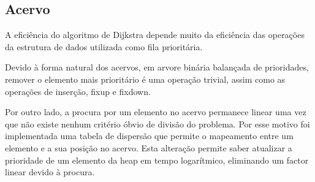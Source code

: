 \documentclass[portuguese, a4paper]{article}
\begin{document}
	\subsection{Acervo}
	\par
	A eficiência do algoritmo de Dijkstra depende muito da eficiência das
	operações da estrutura de dados utilizada como fila prioritária.
	\par
	Devido à forma natural dos acervos, em arvore binária balançada de
	prioridades, remover o elemento mais prioritário é uma operação trivial,
	assim como as operações de inserção, fixup e fixdown.
	\par
	Por outro lado, a procura por um elemento no acervo permanece linear uma
	vez que não existe nenhum critério óbvio de divisão do problema. Por esse
	motivo foi implementada uma tabela de dispersão que permite o
	mapeamento entre um elemento e a sua posição no acervo.  Esta alteração
	permite saber atualizar a prioridade de um elemento da heap em tempo
	logarítmico, eliminando um factor linear devido à procura.
\end{document}
